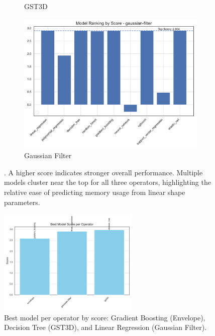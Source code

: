 \begin{figure}[htbp]
\begin{subfigure}[t]{0.32\textwidth}
        \caption{\ac{GST3D}}
    \end{subfigure}
    \hfill
    \begin{subfigure}[t]{0.32\textwidth}
        \includegraphics[width=\textwidth]{assets/images/05/score_by_model_gaussian-filter}
        \caption{Gaussian Filter}
    \end{subfigure}
    \caption{.
    A higher score indicates stronger overall performance.
    Multiple models cluster near the top for all three operators, highlighting the relative ease of predicting memory usage from linear shape parameters.
    \label{fig:score_by_model_operators}
    }
\end{figure}

\begin{figure}[htbp]
    \centering
    \includegraphics[width=0.6\textwidth]{assets/images/05/best_model_per_operator}
    \caption{Best model per operator by score: Gradient Boosting (Envelope), Decision Tree (\ac{GST3D}), and Linear Regression (Gaussian Filter).
    \label{fig:best_model_per_operator}
    }
\end{figure}

